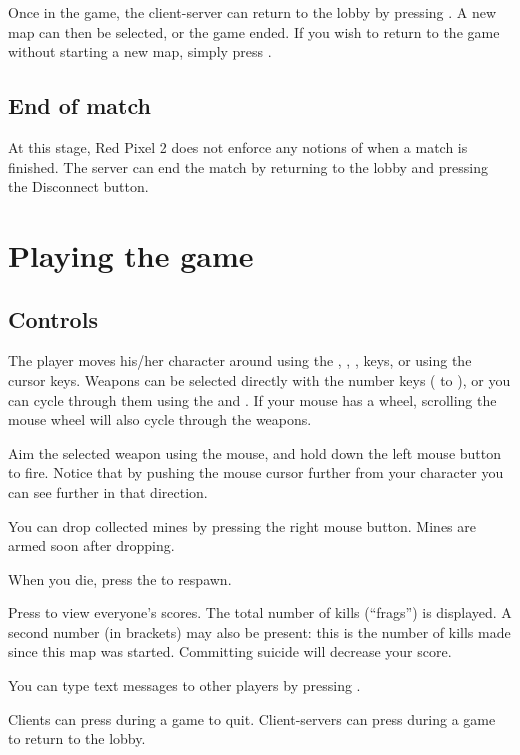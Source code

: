 \documentclass[a4paper,titlepage]{article}
\begin{document}
Once in the game, the client-server can return to the lobby by
pressing .  A new map can then be selected, or the game
ended.  If you wish to return to the game without starting a new map,
simply press .


\subsection{End of match}

At this stage, Red Pixel 2 does not enforce any notions of when a
match is finished.  The server can end the match by returning to the
lobby and pressing the \textsf{Disconnect} button.



\section{Playing the game}


\subsection{Controls}

The player moves his/her character around using the , ,
,  keys, or using the cursor keys.  Weapons can be
selected directly with the number keys ( to ), or you
can cycle through them using the  and .  If your mouse
has a wheel, scrolling the mouse wheel will also cycle through the
weapons.

Aim the selected weapon using the mouse, and hold down the left mouse
button to fire.  Notice that by pushing the mouse cursor further from
your character you can see further in that direction.

You can drop collected mines by pressing the right mouse button.
Mines are armed soon after dropping.

When you die, press the  to respawn.

Press  to view everyone's scores.  The total number of kills
(``frags'') is displayed.  A second number (in brackets) may also be
present: this is the number of kills made since this map was started.
Committing suicide will decrease your score.

You can type text messages to other players by pressing .

Clients can press  during a game to quit.  Client-servers can
press  during a game to return to the lobby.
\end{document}
